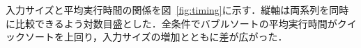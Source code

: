 入力サイズと平均実行時間の関係を図~\ref{fig:timing}に示す．縦軸は両系列を同時に比較できるよう対数目盛とした．全条件でバブルソートの平均実行時間がクイックソートを上回り，入力サイズの増加とともに差が広がった．

